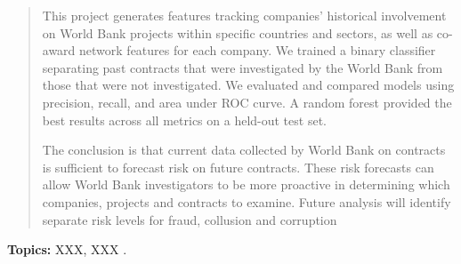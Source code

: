 \begin{quotation}
This project generates features tracking companies’ historical involvement on World Bank projects within specific countries and sectors, as well as co-award network features for each company. We trained a binary classifier separating past contracts that were investigated by the World Bank from those that were not investigated. We evaluated and compared models using precision, recall, and area under ROC curve. A random forest provided the best results across all metrics on a held-out test set.

The conclusion is that current data collected by World Bank on contracts is sufficient to forecast risk on future contracts. These risk forecasts can allow World Bank investigators to be more proactive in determining which companies, projects and contracts to examine. Future analysis will identify separate risk levels for fraud, collusion and corruption
\end{quotation}

\vfill
\small \noindent \textbf{Topics:} XXX, XXX .
\normalsize